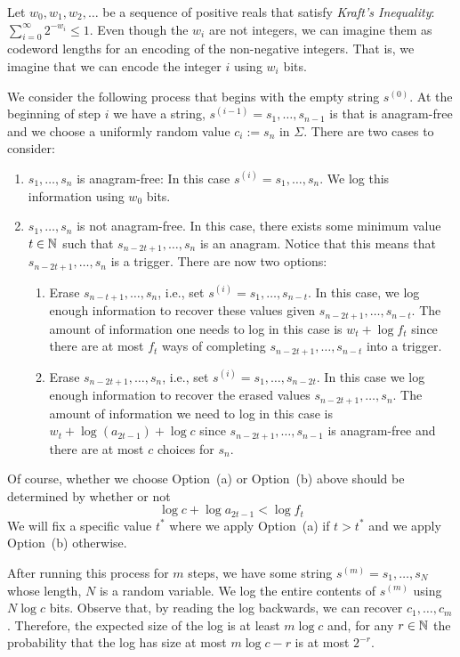 \documentclass{patmorin}
\begin{document}
Let $w_0,w_1,w_2,\ldots$ be a sequence of positive reals that satisfy \emph{Kraft's Inequality}: $\sum_{i=0}^\infty 2^{-w_i} \le 1$.  Even though the $w_i$ are not integers, we can imagine them as codeword lengths for an encoding of the non-negative integers.  That is, we imagine that we can encode the integer $i$ using $w_i$ bits.

We consider the following process that begins with the empty string $s^{(0)}$.  At the beginning of step $i$ we have a string, $s^{(i-1)}=s_1,\ldots,s_{n-1}$ is that is anagram-free and we choose a uniformly random value $c_i:=s_n$ in $\Sigma$. There are two cases to consider:

\begin{enumerate}
  \item $s_1,\ldots,s_n$ is anagram-free:  In this case $s^{(i)}=s_1,\ldots,s_n$.  We log this information using $w_0$ bits.
  
  \item $s_1,\ldots,s_n$ is not anagram-free.  In this case, there exists some minimum value $t\in\mathbb{N}$ such that $s_{n-2t+1},\ldots,s_n$ is an anagram.   Notice that this means that $s_{n-2t+1},\ldots,s_n$ is a trigger. There are now two options:
  \begin{enumerate}
    \item Erase $s_{n-t+1},\ldots,s_n$, i.e., set $s^{(i)}=s_1,\ldots,s_{n-t}$.  In this case, we log enough information to recover these values given $s_{n-2t+1},\ldots,s_{n-t}$.  The amount of information one needs to log in this case is $w_t + \log f_t$ since there are at most $f_t$ ways of completing $s_{n-2t+1},\ldots,s_{n-t}$ into a trigger.

    \item Erase $s_{n-2t+1},\ldots,s_n$, i.e., set $s^{(i)}=s_{1},\ldots,s_{n-2t}$.  In this case we log enough information to recover the erased values $s_{n-2t+1},\ldots,s_n$.  The amount of information we need to log in this case is $w_t+ \log(a_{2t-1}) + \log c$ since $s_{n-2t+1},\ldots,s_{n-1}$ is anagram-free and there are at most $c$ choices for $s_n$.
  \end{enumerate}
\end{enumerate}
Of course, whether we choose Option~(a) or Option~(b) above should be determined by whether or not
\[
       \log c + \log a_{2t-1} < \log f_t
\]
We will fix a specific value $t^*$ where we apply Option~(a) if $t>t^*$ and we apply Option~(b) otherwise.

After running this process for $m$ steps, we have some string $s^{(m)}=s_1,\ldots,s_N$ whose length, $N$ is a random variable.  We log the entire contents of $s^{(m)}$ using $N\log c$ bits.  Observe that, by reading the log backwards, we can recover $c_1,\ldots,c_m$.  Therefore, the expected size of the log is at least $m\log c$ and, for any $r\in\mathbb{N}$ the probability that the log has size at most $m\log c-r$ is at most $2^{-r}$.
\end{document}
